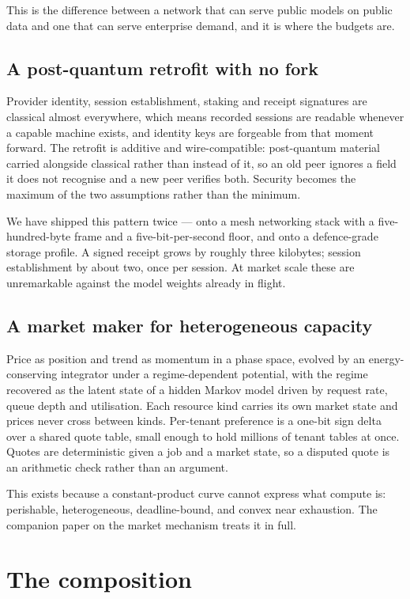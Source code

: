 \documentclass[11pt,a4paper]{article}
\begin{document}
This is the difference between a network that can serve public models on public
data and one that can serve enterprise demand, and it is where the budgets are.

\subsection{A post-quantum retrofit with no fork}

Provider identity, session establishment, staking and receipt signatures are
classical almost everywhere, which means recorded sessions are readable whenever
a capable machine exists, and identity keys are forgeable from that moment
forward. The retrofit is additive and wire-compatible: post-quantum material
carried alongside classical rather than instead of it, so an old peer ignores a
field it does not recognise and a new peer verifies both. Security becomes the
maximum of the two assumptions rather than the minimum.

We have shipped this pattern twice --- onto a mesh networking stack with a
five-hundred-byte frame and a five-bit-per-second floor, and onto a
defence-grade storage profile. A signed receipt grows by roughly three
kilobytes; session establishment by about two, once per session. At market
scale these are unremarkable against the model weights already in flight.

\subsection{A market maker for heterogeneous capacity}

Price as position and trend as momentum in a phase space, evolved by an
energy-conserving integrator under a regime-dependent potential, with the regime
recovered as the latent state of a hidden Markov model driven by request rate,
queue depth and utilisation. Each resource kind carries its own market state and
prices never cross between kinds. Per-tenant preference is a one-bit sign delta
over a shared quote table, small enough to hold millions of tenant tables at
once. Quotes are deterministic given a job and a market state, so a disputed
quote is an arithmetic check rather than an argument.

This exists because a constant-product curve cannot express what compute is:
perishable, heterogeneous, deadline-bound, and convex near exhaustion. The
companion paper on the market mechanism treats it in full.

\section{The composition}
\end{document}
